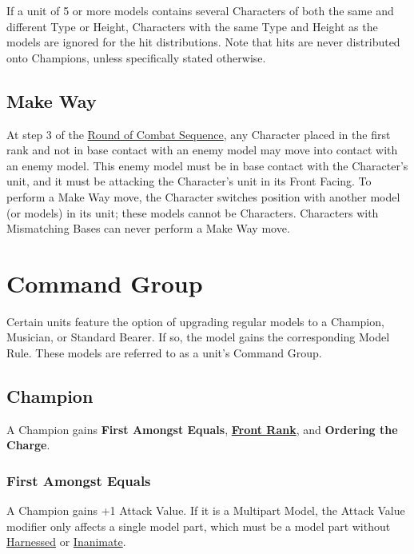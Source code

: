 If a unit of 5 or more \rnf{} models contains several Characters of both the same and different Type or Height, Characters with the same Type and Height as the \rnf{} models are ignored for the hit distributions. Note that hits are never distributed onto Champions, unless specifically stated otherwise.

\subsection{Make Way}
\label{make_way}

At step 3 of the \hyperref[round_of_combat_sequence]{Round of Combat Sequence}, any Character placed in the first rank and not in base contact with an enemy model may move into contact with an enemy model. This enemy model must be in base contact with the Character's unit, and it must be attacking the Character's unit in its Front Facing. To perform a Make Way move, the Character switches position with another model (or models) in its unit; these models cannot be Characters. Characters with Mismatching Bases can never perform a Make Way move.

\section{Command Group}
\label{command_group}

Certain units feature the option of upgrading regular models to a Champion, Musician, or Standard Bearer. If so, the model gains the corresponding Model Rule. These models are referred to as a unit's Command Group.

\subsection{Champion}
\label{champion}

A Champion gains \textbf{First Amongst Equals}, \hyperref[front_rank]{\textbf{Front Rank}}, and \textbf{Ordering the Charge}.

\subsubsection{First Amongst Equals}
\label{first_among_equals}

A Champion gains +1 Attack Value. If it is a Multipart Model, the Attack Value modifier only affects a single model part, which must be a model part without \hyperref[harnessed]{Harnessed} or \hyperref[inanimate]{Inanimate}.

